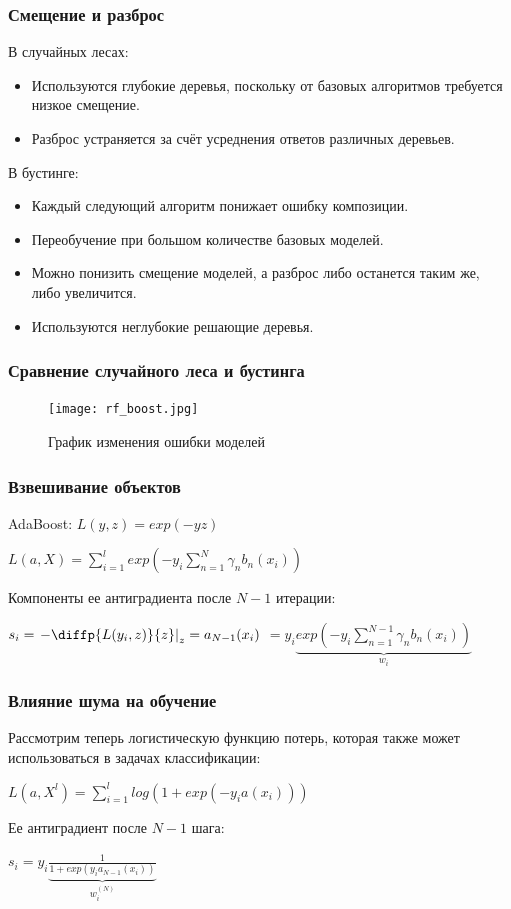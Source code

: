 \documentclass[fleqn,pdf, 9pt, usenames, dvipsnames, unicode, hyperref={bookmarks=true,bookmarksopen=false, bookmarksnumbered}]{beamer}
\begin{document}
\begin{frame}\frametitle{Смещение и разброс}

В случайных лесах:
\begin{itemize}
    \item Используются глубокие деревья, поскольку от базовых алгоритмов требуется низкое смещение.
    \item Разброс  устраняется за счёт усреднения ответов различных деревьев.
\end{itemize}

В бустинге:

\begin{itemize}
    \item Каждый следующий алгоритм понижает ошибку композиции.
    \item Переобучение при большом количестве базовых моделей.
    \item Можно понизить смещение моделей, а разброс либо останется таким же, либо увеличится.
    \item Используются неглубокие решающие деревья.
\end{itemize}


\end{frame}

\begin{frame}\frametitle{Сравнение случайного леса и бустинга}

\begin{figure}[!ht]
	\centering
	\texttt{[image: rf\_boost.jpg]}
	\caption{График изменения ошибки моделей}
	\label{fig:rf}
\end{figure}

\end{frame}

\begin{frame}\frametitle{Взвешивание объектов}

AdaBoost: $L(y,z)= exp(-yz)$

\hfill \break

$L(a,X) = \sum_{i=1}^{l} exp\left(-y_i\sum_{n=1}^{N}\gamma_nb_n(x_i)\right)$

\hfill \break

Компоненты ее антиградиента после $N-1$ итерации:

$s_i=\left. -\diffp{L(y_i,z)}{z}\right|_z=a_{N-1}(x_i)$ $=y_i\underbrace{exp\left(-y_i\sum_{n=1}^{N-1}\gamma_nb_n(x_i)\right)}_{w_i}$


\end{frame}

\begin{frame}\frametitle{Влияние шума на обучение}

Рассмотрим теперь логистическую функцию потерь, которая также может использоваться в задачах классификации:

$L(a,X^l) = \sum_{i=1}^{l}log(1+exp(-y_ia(x_i)))$

\hfill \break

Ее антиградиент после $N-1$ шага:

$s_i = y_i \underbrace{\frac{1}{1+exp(y_ia_{N-1}(x_i))}}_{w_i^{(N)}}$


\end{frame}

\end{document}
